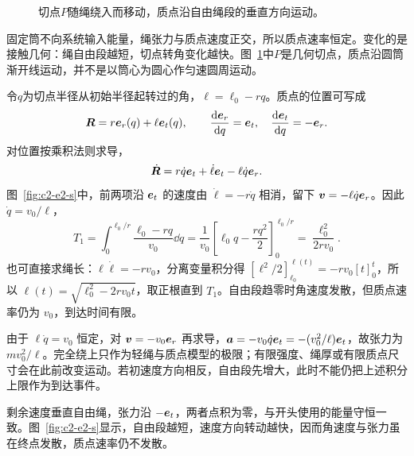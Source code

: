\begin{figure}[H]\centering
{}
\caption{切点$P$随绳绕入而移动，质点沿自由绳段的垂直方向运动。}\label{fig:c2-e2-q}
\end{figure}
\begin{solution}
固定筒不向系统输入能量，绳张力与质点速度正交，所以质点速率恒定。变化的是接触几何：绳自由段越短，切点转角变化越快。图~\ref{fig:c2-e2-q}中$P$是几何切点，质点沿圆筒渐开线运动，并不是以筒心为圆心作匀速圆周运动。


令$q$为切点半径从初始半径起转过的角，$\ell=\ell_0-rq$。质点的位置可写成
\[\bm{R}=r\bm{e}_r(q)+\ell\bm{e}_t(q),\qquad
\frac{\mathop{}\!\mathrm d\bm{e}_r}{\mathop{}\!\mathrm d q}=\bm{e}_t,\quad
\frac{\mathop{}\!\mathrm d\bm{e}_t}{\mathop{}\!\mathrm d q}=-\bm{e}_r.
\]
对位置按乘积法则求导，
\[
\dot{\bm{R}}=r\dot q\bm{e}_t+\dot\ell\bm{e}_t-\ell\dot q\bm{e}_r.
\]
图~\ref{fig:c2-e2-s}中，前两项沿 $\bm{e}_t$ 的速度由 $\dot\ell=-r\dot q$ 相消，留下 $\bm{v}=-\ell\dot q\bm{e}_r$。因此 $\dot q=v_0/\ell$，
\[T_1=\int_0^{\ell_0/r}\frac{\ell_0-rq}{v_0}\dd q
=\frac1{v_0}\left[\ell_0q-\frac{rq^2}{2}\right]_0^{\ell_0/r}
=\boxed{\frac{\ell_0^2}{2rv_0}}.
\]
也可直接求绳长：$\ell\dot\ell=-rv_0$，分离变量积分得 $[\ell^2/2]_{\ell_0}^{\ell(t)}=-rv_0[t]_0^t$，所以 $\ell(t)=\sqrt{\ell_0^2-2rv_0t}$，取正根直到 $T_1$。自由段趋零时角速度发散，但质点速率仍为 $v_0$，到达时间有限。

由于 $\ell\dot q=v_0$ 恒定，对 $\bm{v}=-v_0\bm{e}_r$ 再求导，$\bm{a}=-v_0\dot q\bm{e}_t=-(v_0^2/\ell)\bm{e}_t$，故张力为 $mv_0^2/\ell$。完全绕上只作为轻绳与质点模型的极限；有限强度、绳厚或有限质点尺寸会在此前改变运动。若初速度方向相反，自由段先增大，此时不能仍把上述积分上限作为到达事件。


剩余速度垂直自由绳，张力沿 $-\bm{e}_t$，两者点积为零，与开头使用的能量守恒一致。图~\ref{fig:c2-e2-s}显示，自由段越短，速度方向转动越快，因而角速度与张力虽在终点发散，质点速率仍不发散。


\end{solution}
